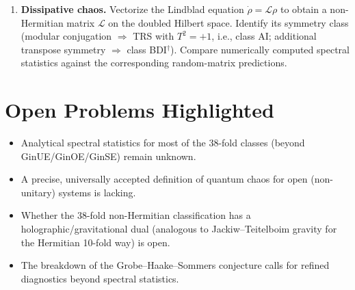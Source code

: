 \documentclass[11pt,a4paper]{article}
\begin{document}
\begin{enumerate}
  \item \textbf{Dissipative chaos.}
    Vectorize the Lindblad equation $\dot\rho=\mathcal{L}\rho$ to obtain a non-Hermitian matrix $\mathcal{L}$ on the doubled Hilbert space.  Identify its symmetry class (modular conjugation $\Rightarrow$ TRS with $T^2=+1$, i.e., class AI; additional transpose symmetry $\Rightarrow$ class BDI$^\dagger$).  Compare numerically computed spectral statistics against the corresponding random-matrix predictions.
\end{enumerate}

\section{Open Problems Highlighted}
\begin{itemize}[nosep]
  \item Analytical spectral statistics for most of the 38-fold classes (beyond GinUE/GinOE/GinSE) remain unknown.
  \item A precise, universally accepted definition of quantum chaos for open (non-unitary) systems is lacking.
  \item Whether the 38-fold non-Hermitian classification has a holographic/gravitational dual (analogous to Jackiw--Teitelboim gravity for the Hermitian 10-fold way) is open.
  \item The breakdown of the Grobe--Haake--Sommers conjecture calls for refined diagnostics beyond spectral statistics.
\end{itemize}
\end{document}
